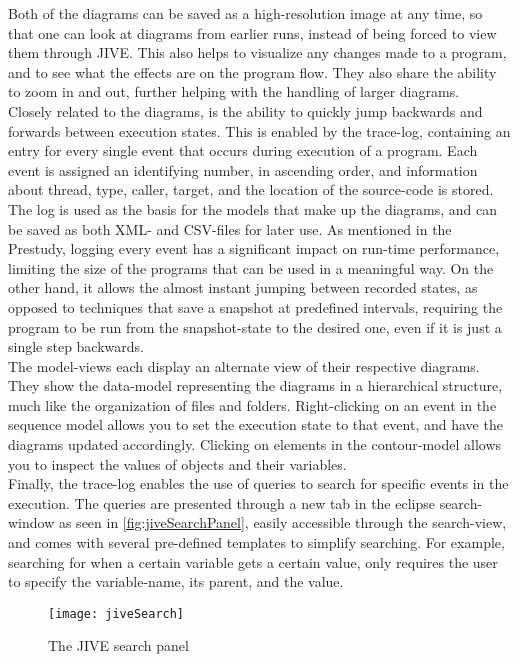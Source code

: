 Both of the diagrams can be saved as a high-resolution image at any time, so that one can look at diagrams from earlier runs, instead of being forced to view them through JIVE.
This also helps to visualize any changes made to a program, and to see what the effects are on the program flow.
They also share the ability to zoom in and out, further helping with the handling of larger diagrams.
~\\

Closely related to the diagrams, is the ability to quickly jump backwards and forwards between execution states.
This is enabled by the trace-log, containing an entry for every single event that occurs during execution of a program.
Each event is assigned an identifying number, in ascending order, and information about thread, type, caller, target, and the location of the source-code is stored.
The log is used as the basis for the models that make up the diagrams, and can be saved as both XML- and CSV-files for later use.
As mentioned in the Prestudy, logging every event has a significant impact on run-time performance, limiting the size of the programs that can be used in a meaningful way.
On the other hand, it allows the almost instant jumping between recorded states, as opposed to techniques that save a snapshot at predefined intervals, requiring the program to be run from the snapshot-state to the desired one, even if it is just a single step backwards.
~\\

The model-views each display an alternate view of their respective diagrams.%
They show the data-model representing the diagrams in a hierarchical structure, much like the organization of files and folders.
Right-clicking on an event in the sequence model allows you to set the execution state to that event, and have the diagrams updated accordingly.
Clicking on elements in the contour-model allows you to inspect the values of objects and their variables.
~\\

Finally, the trace-log enables the use of queries to search for specific events in the execution.
The queries are presented through a new tab in the eclipse search-window as seen in \autoref{fig:jiveSearchPanel}, easily accessible through the search-view, and comes with several pre-defined templates to simplify searching.
For example, searching for when a certain variable gets a certain value, only requires the user to specify the variable-name, its parent, and the value.
\begin{figure}[H]
	\centering
	\texttt{[image: jiveSearch]}
	\caption{The JIVE search panel}
	\label{fig:jiveSearchPanel}
\end{figure}
~\\

